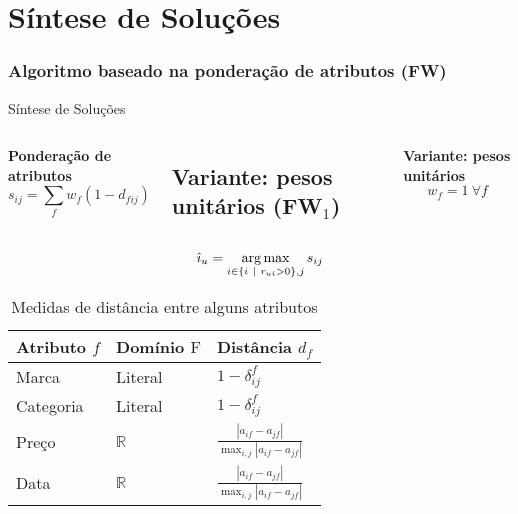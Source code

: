\section[Síntese de Soluções]{Síntese de Soluções}
\subsubsection{Algoritmo baseado na ponderação de atributos (FW)} %
\label{ssub:algoritmo_baseado_na_pondera_o_de_atributos_fw_}
\begin{frame}{Síntese de Soluções}
\begin{columns}[c]
\textbf{Ponderação de atributos}
$$
    s_{ij} = \sum_{f}{w_{f} \left(1-d_{fij}\right)}
$$

\hfill
{} %

\subsection{Variante: pesos unitários (FW$_1$)} %
\label{sub:variante_pesos_unit_rios}

\textbf{Variante: pesos unitários}
$$
w_f = 1~\forall f
$$
\hfill
\end{columns}

\begin{equation}
\label{eq:ifw} 
    \hat{\imath}_u = \operatorname*{arg\,max}_{i \in \left\{i~|~r_{ui} > 0\right\}, j}{s_{ij}}
\end{equation} 

\begin{table}[hp]
\begin{center}
    \caption{Medidas de distância entre alguns atributos}
    \label{tab:medidas-distancia}
    \begin{tabular}{  | p{3cm} | p{3cm} | p{3cm} | } 
    \hline
    \textbf{Atributo} $f$ & \textbf{Domínio} $\mathrm{F}$ & \textbf{Distância} $d_f$ \\ \hline
    Marca & Literal & $1-\delta^f_{ij}$ \\ \hline    
    Categoria & Literal & $1-\delta^f_{ij}$ \\ \hline
    Preço & $\mathbb{R}$ & $ \frac{\left| a_{if}-a_{jf} \right|}{\max_{i,j}{\left| a_{if}-a_{jf} \right|}} $ \\ \hline
    Data & $\mathbb{R}$ & $ \frac{\left| a_{if}-a_{jf} \right|}{\max_{i,j}{\left| a_{if}-a_{jf} \right|}} $ \\ \hline
    \end{tabular}
\end{center}
\end{table}
\end{frame}




